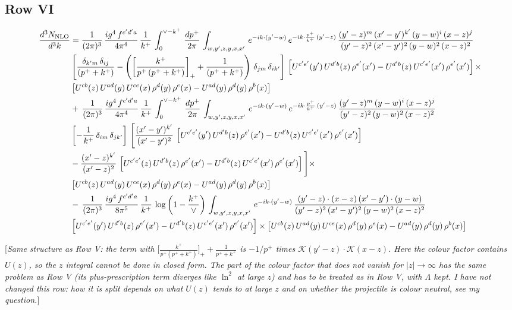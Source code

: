 \documentclass[9pt]{article}
\numberwithin{equation}{section}
\newcommand{\rnote}[1]{{\color{teal}[\textit{#1}]}}
\begin{document}
\subsection{Row VI}
\begin{align}
    \frac{d^{3}N_{\rm NLO}}{d^{3}k} & =  \frac{1}{(2\pi)^{3}}\, \frac{ig^{4}\,f^{c'd'a}}{4\pi^{4}}\, \frac{1}{k^{+}}\,\int_{0}^{\vee-k^{+}}\, \frac{dp^{+}}{2\pi}\, \int_{w,y',z,y,x,x'}\, e^{-ik\cdot (y'-w)}\, e^{-ik\cdot \frac{p^{+}}{k^{+}}\,(y'-z)}\,\frac{(y'-z)^{m}\,(x'-y')^{k'}\,(y-w)^{i}\,(x-z)^{j}}{(y'-z)^{2}\,(x'-y')^{2}\,(y-w)^{2}\,(x-z)^{2}}\notag \\ & \left[\frac{\delta_{k'm}\,\delta_{ij}}{(p^{+}+k^{+})}-\left(\left[\frac{k^{+}}{p^{+}\,(p^{+}+k^{+})}\right]_{+}+\frac{1}{(p^{+}+k^{+})}\right)\,\delta_{jm}\,\delta_{ik'}\right]\, \left[U^{c'e'}(y')\,U^{d'b}(z)\,\rho^{e'}(x')-U^{d'b}(z)\,U^{c'e'}(x')\,\rho^{e'}(x')\right]\times\notag \\ &  \left[U^{cb}(z)\,U^{ad}(y)\,U^{ce}(x)\,\rho^{d}(y)\,\rho^{e}(x)-U^{ad}(y)\,\rho^{d}(y)\,\rho^{b}(x)\right] \notag \\ &  +\,\frac{1}{(2\pi)^{3}}\, \frac{ig^{4}\,f^{c'd'a}}{4\pi^{4}}\, \frac{1}{k^{+}}\,\int_{0}^{\vee-k^{+}}\, \frac{dp^{+}}{2\pi}\, \int_{w,y',z,y,x,x'}\, e^{-ik\cdot (y'-w)}\, e^{-ik\cdot \frac{p^{+}}{k^{+}}\,(y'-z)}\,\frac{(y'-z)^{m}\,(y-w)^{i}\,(x-z)^{j}}{(y'-z)^{2}\,(y-w)^{2}\,(x-z)^{2}}\notag \\ &  \left[-\frac{1}{k^{+}}\, \delta_{im}\, \delta_{jk'}\right]\, \Bigg[\frac{(x'-y')^{k'}}{(x'-y')^{2}}\,\left[U^{c'e'}(y')\,U^{d'b}(z)\,\rho^{e'}(x')-U^{d'b}(z)\,U^{c'e'}(x')\,\rho^{e'}(x')\right]\notag \\ & -\frac{(x'-z)^{k'}}{(x'-z)^{2}}\,\left[U^{c'e'}(z)\,U^{d'b}(z)\,\rho^{e'}(x')-U^{d'b}(z)\,U^{c'e'}(x')\,\rho^{e'}(x')\right]\Bigg]\times\notag \\ &    \left[U^{cb}(z)\,U^{ad}(y)\,U^{ce}(x)\,\rho^{d}(y)\,\rho^{e}(x)-U^{ad}(y)\,\rho^{d}(y)\,\rho^{b}(x)\right] \notag \\
&  -\,\frac{1}{(2\pi)^{3}}\, \frac{ig^{4}\,f^{c'd'a}}{8\pi^{5}}\, \frac{1}{k^{+}}\,\log{\left(1-\frac{k^{+}}{\vee}\right)}\, \int_{w,y',z,y,x,x'}\, e^{-ik\cdot (y'-w)}\,\frac{(y'-z)\cdot (x-z)\,(x'-y')\cdot (y-w)}{(y'-z)^{2}\,(x'-y')^{2}\,(y-w)^{2}\,(x-z)^{2}}\notag \\ & \left[U^{c'e'}(y')\,U^{d'b}(z)\,\rho^{e'}(x')-U^{d'b}(z)\,U^{c'e'}(x')\,\rho^{e'}(x')\right]\times  \left[U^{cb}(z)\,U^{ad}(y)\,U^{ce}(x)\,\rho^{d}(y)\,\rho^{e}(x)-U^{ad}(y)\,\rho^{d}(y)\,\rho^{b}(x)\right]
\end{align}

\rnote{Same structure as Row V: the term with $\big[\frac{k^{+}}{p^{+}(p^{+}+k^{+})}\big]_{+}+\frac{1}{p^{+}+k^{+}}$ is $-1/p^{+}$ times $\mathcal{K}(y'-z)\cdot\mathcal{K}(x-z)$. Here the colour factor contains $U(z)$, so the $z$ integral cannot be done in closed form. The part of the colour factor that does not vanish for $|z|\to\infty$ has the same problem as Row V (its plus-prescription term diverges like $\ln^{2}$ at large $z$) and has to be treated as in Row V, with $\Lambda$ kept. I have not changed this row: how it is split depends on what $U(z)$ tends to at large $z$ and on whether the projectile is colour neutral, see my question.}
\end{document}
